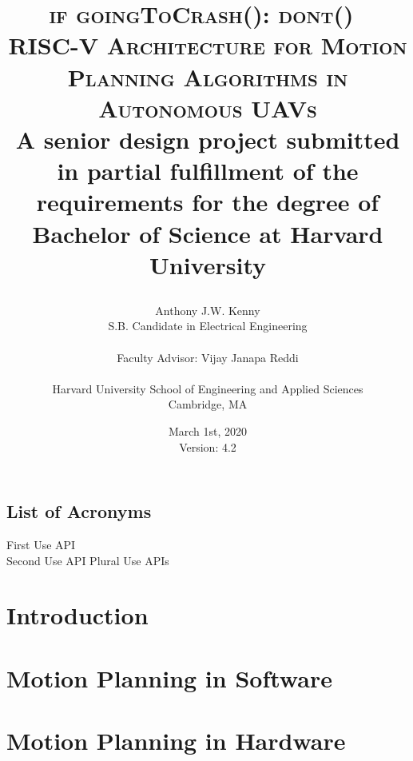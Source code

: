 \documentclass[
    11pt,           %
    letterpaper,    %
    oneside         %
]{report}           %
\title{\textsc{if goingToCrash(): dont()\ \\ RISC-V Architecture for Motion Planning Algorithms in Autonomous UAVs} \\ 
    \bigskip
    \small{A senior design project submitted in partial fulfillment of the requirements for the degree of Bachelor of Science at Harvard University} \\
\author{Anthony J.W. Kenny \\
        \small{S.B. Candidate in Electrical Engineering} \\ \\
        Faculty Advisor: Vijay Janapa Reddi \\ \\
        Harvard University School of Engineering and Applied Sciences \\
        \small{Cambridge, MA}}
\date{March 1st, 2020 \\ 
    \small{Version: 4.2}}}
\begin{document}
\maketitle


    
    \clearpage

    \tableofcontents
    \clearpage

    \section*{List of Acronyms}

 


    \newpage
    First Use \gls{API}\\ 
    Second Use \gls{API} 
    Plural Use \glspl{API}

    \newpage
    \printglossary[type=\acronymtype]
    \newpage
    \printglossary[type=main]



\chapter{Introduction}
    


\chapter{Motion Planning in Software}
    \label{chap:MotionPlanningInSoftware}
    

\chapter{Motion Planning in Hardware}
    \label{chap:MotionPlanningInHardware}
    
\end{document}
